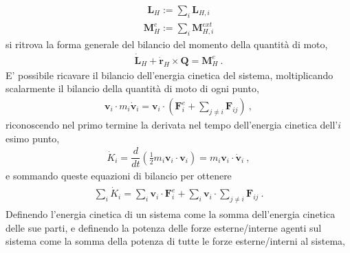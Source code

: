 \documentclass[letterpaper,10pt,english]{jupyterBook}
\begin{document}
\begin{equation*}
\begin{split}\mathbf{L}_H := \sum_i \mathbf{L}_{H,i}\end{split}
\end{equation*}\begin{equation*}
\begin{split}\mathbf{M}_H^e := \sum_i \mathbf{M}_{H,i}^{ext}\end{split}
\end{equation*}
\sphinxAtStartPar
si ritrova la forma generale del bilancio del momento della quantità di moto,
\begin{equation*}
\begin{split}\dot{\mathbf{L}}_{H} + \dot{\mathbf{r}}_H \times \mathbf{Q} = \mathbf{M}_H^e \ .\end{split}
\end{equation*}
\sphinxAtStartPar
{}
E’ possibile ricavare il bilancio dell’energia cinetica del sistema, moltiplicando scalarmente il bilancio della quantità di moto di ogni punto,
\begin{equation*}
\begin{split}\mathbf{v}_i \cdot m_i \dot{\mathbf{v}}_i = \mathbf{v}_i \cdot \left( \mathbf{F}_i^{e} + \sum_{j \ne i} \mathbf{F}_{ij} \right) \ ,\end{split}
\end{equation*}
\sphinxAtStartPar
riconoscendo nel primo termine la derivata nel tempo dell’energia cinetica dell’\(i\)\sphinxhyphen{}esimo punto,
\begin{equation*}
\begin{split}\dot{K}_i = \dfrac{d}{dt} \left( \frac{1}{2} m_i \mathbf{v}_i \cdot \mathbf{v}_i \right) = m_i \mathbf{v}_i \cdot \dot{\mathbf{v}}_i \ ,\end{split}
\end{equation*}
\sphinxAtStartPar
e sommando queste equazioni di bilancio per ottenere
\begin{equation*}
\begin{split}\begin{aligned}
  \sum_i \dot{K}_i = \sum_i \mathbf{v}_i \cdot  \mathbf{F}_i^{e} + \sum_i \mathbf{v}_i \cdot \sum_{j \ne i} \mathbf{F}_{ij} \ . 
\end{aligned}\end{split}
\end{equation*}
\sphinxAtStartPar
Definendo l’energia cinetica di un sistema come la somma dell’energia cinetica delle sue parti, e definendo la potenza delle forze esterne/interne agenti sul sistema come la somma della potenza di tutte le forze esterne/interni al sistema,
\end{document}
